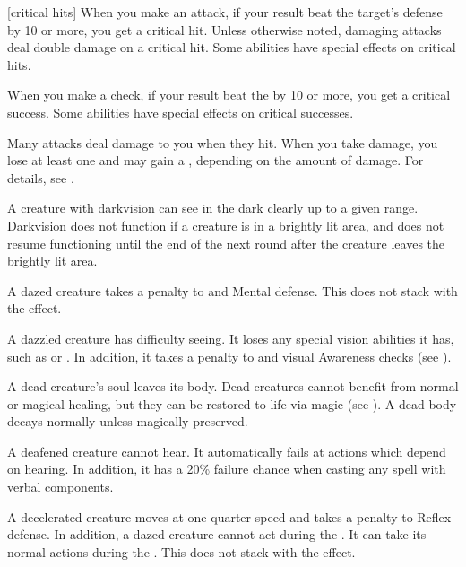 [critical hits] When you make an attack, if your result beat the target's defense by 10 or more, you get a critical hit.
Unless otherwise noted, damaging attacks deal double damage on a critical hit.
Some abilities have special effects on critical hits.

 When you make a check, if your result beat the  by 10 or more, you get a critical success.
Some abilities have special effects on critical successes.

 Many attacks deal damage to you when they hit.
When you take damage, you lose at least one  and may gain a , depending on the amount of damage.
For details, see .

 A creature with darkvision can see in the dark clearly up to a given range.
Darkvision does not function if a creature is in a brightly lit area, and does not resume functioning until the end of the next round after the creature leaves the brightly lit area.

 A dazed creature takes a  penalty to  and Mental defense.
This does not stack with the  effect.

 A dazzled creature has difficulty seeing.
It loses any special vision abilities it has, such as  or .
In addition, it takes a  penalty to  and visual Awareness checks (see ).

 A dead creature's soul leaves its body. Dead creatures cannot benefit from normal or magical healing, but they can be restored to life via magic (see ). A dead body decays normally unless magically preserved.

 A deafened creature cannot hear. It automatically fails at actions which depend on hearing. In addition, it has a 20\% failure chance when casting any spell with verbal components.

 A decelerated creature moves at one quarter speed and takes a  penalty to Reflex defense.
In addition, a dazed creature cannot act during the .
It can take its normal actions during the .
This does not stack with the  effect.

